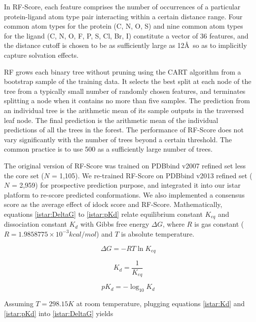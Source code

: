 In RF-Score, each feature comprises the number of occurrences of a particular protein-ligand atom type pair interacting within a certain distance range. Four common atom types for the protein (C, N, O, S) and nine common atom types for the ligand (C, N, O, F, P, S, Cl, Br, I) constitute a vector of 36 features, and the distance cutoff is chosen to be as sufficiently large as 12\AA\ so as to implicitly capture solvation effects.

RF grows each binary tree without pruning using the CART algorithm \citep{1310} from a bootstrap sample of the training data. It selects the best split at each node of the tree from a typically small number of randomly chosen features, and terminates splitting a node when it contains no more than five samples. The prediction from an individual tree is the arithmetic mean of its sample outputs in the traversed leaf node. The final prediction is the arithmetic mean of the individual predictions of all the trees in the forest. The performance of RF-Score does not vary significantly with the number of trees beyond a certain threshold. The common practice is to use 500 as a sufficiently large number of trees.

The original version of RF-Score \citep{564} was trained on PDBbind v2007 refined set less the core set ($N$ = 1,105). We re-trained RF-Score on PDBbind v2013 refined set ($N$ = 2,959) for prospective prediction purpose, and integrated it into our istar platform to re-score predicted conformations. We also implemented a consensus score as the average effect of idock score and RF-Score. Mathematically, equations \eqref{istar:DeltaG} to \eqref{istar:pKd} relate equilibrium constant $K_{eq}$ and dissociation constant $K_d$ with Gibbs free energy $\Delta G$, where $R$ is gas constant ($R = 1.9858775 \times 10^{-3} kcal/mol$) and $T$ is absolute temperature.

\begin{equation}
\label{istar:DeltaG}
\Delta G = -RT\ln K_{eq}
\end{equation}

\begin{equation}
\label{istar:Kd}
K_d = \frac{1}{K_{eq}}
\end{equation}

\begin{equation}
\label{istar:pKd}
pK_d = -\log_{10} K_d
\end{equation}

Assuming $T = 298.15K$ at room temperature, plugging equations \eqref{istar:Kd} and \eqref{istar:pKd} into \eqref{istar:DeltaG} yields

